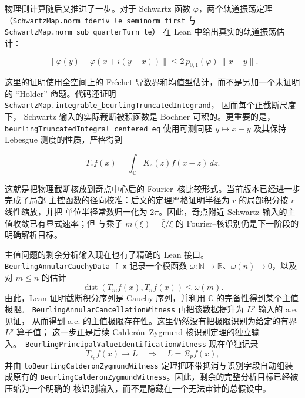 \documentclass[UTF8,fontset=none,a4paper,11pt]{ctexart}
\begin{document}
物理侧计算随后又推进了一步。对于 Schwartz 函数 \(\varphi\)，两个轨道振荡定理
（\texttt{SchwartzMap.\allowbreak norm\_fderiv\allowbreak\_le\allowbreak\_seminorm\allowbreak\_first}
与 \texttt{SchwartzMap.\allowbreak norm\_sub\allowbreak\_quarterTurn\allowbreak\_le}）
在 Lean 中给出真实的轨道振荡估计：

\[
 \lVert\varphi(y)-\varphi(x+i(y-x))\rVert
 \leq 2\,p_{0,1}(\varphi)\,\lVert x-y\rVert .
\]

这里的证明使用全空间上的 Fréchet 导数界和均值型估计，而不是另加一个未证明的
``Holder'' 命题。代码还证明
\texttt{SchwartzMap.\allowbreak integrable\allowbreak\_beurling\allowbreak Truncated\allowbreak Integrand}，
因而每个正截断尺度下，
Schwartz 输入的实际截断被积函数是 Bochner 可积的。更重要的是，
\texttt{beurlingTruncatedIntegral\_centered\_eq} 使用可测同胚
\(y\mapsto x-y\) 及其保持 Lebesgue 测度的性质，严格得到

\[
 T_\varepsilon f(x)
 =
 \int_{\mathbb C}K_\varepsilon(z)f(x-z)\,dz .
\]

这就是把物理截断核放到奇点中心后的 Fourier--核比较形式。当前版本已经进一步完成了局部
主控函数的径向校准：后文的定理严格证明半径为 \(r\) 的局部积分按 \(r\) 线性缩放，并把
单位半径常数归一化为 \(2\pi\)。因此，奇点附近 Schwartz 输入的主值收敛已有显式速率；但
与乘子 \(m(\xi)=\overline{\xi}/\xi\) 的 Fourier--核识别仍是下一阶段的明确解析目标。\par

主值问题的剩余分析输入现在也有了精确的 Lean 接口。
\texttt{BeurlingAnnularCauchyData f x} 记录一个模函数
\(\omega:\mathbb N\to\mathbb R\)、\(\omega(n)\to0\)，以及对 \(m\le n\) 的估计
\[
 \operatorname{dist}(T_m f(x),T_n f(x))\le\omega(m).
\]
由此，Lean 证明截断积分序列是 Cauchy 序列，并利用 \(\mathbb C\) 的完备性得到某个主值极限。
\texttt{BeurlingAnnularCancellationWitness} 再把该数据提升为 \(L^p\) 输入的 a.e. 见证，
从而得到 a.e. 的主值极限存在性。这里仍然没有把极限识别为给定的有界 \(L^p\) 算子值；
这一步正是后续 Calderón--Zygmund 核识别定理的独立输入。\ 
\texttt{BeurlingPrincipalValueIdentification}\allowbreak\texttt{Witness} 现在单独记录
\[
 T_{\varepsilon_n}f(x)\longrightarrow L
 \quad\Longrightarrow\quad
 L=\mathcal B_p f(x),
\]
并由 \texttt{toBeurlingCalderonZygmundWitness} 定理把环带抵消与识别字段自动组装成原有的
\texttt{BeurlingCalderonZygmundWitness}。因此，剩余的完整分析目标已经被压缩为一个明确的
核识别输入，而不是隐藏在一个无法审计的总假设中。\par
\end{document}
